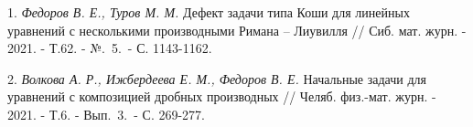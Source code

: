 
\litlist

1. {\it Федоров В. Е., Туров М. М.} Дефект задачи типа Коши для линейных уравнений с несколькими производными Римана – Лиувилля // Сиб. мат. журн. - 2021. - Т.62. - №.~5.~- С. 1143-1162.

2. {\it Волкова А. Р., Ижбердеева Е. М., Федоров В. Е.} Начальные задачи для уравнений с композицией дробных производных // Челяб. физ.-мат. журн. - 2021. - Т.6. - Вып.~3.~- С. 269-277.
